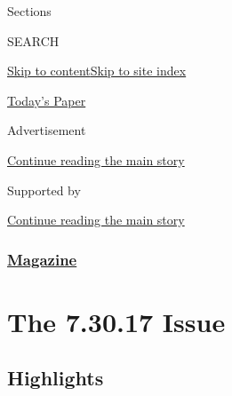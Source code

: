 Sections

SEARCH

\protect\hyperlink{site-content}{Skip to
content}\protect\hyperlink{site-index}{Skip to site index}

\href{https://myaccount.nytimes3xbfgragh.onion/auth/login?response_type=cookie\&client_id=vi}{}

\href{https://www.nytimes3xbfgragh.onion/section/todayspaper}{Today's
Paper}

Advertisement

\protect\hyperlink{after-top}{Continue reading the main story}

Supported by

\protect\hyperlink{after-sponsor}{Continue reading the main story}

\hypertarget{magazine}{%
\subsubsection{\texorpdfstring{\href{/section/magazine}{Magazine}}{Magazine}}\label{magazine}}

\hypertarget{the-73017-issue}{%
\section{The 7.30.17 Issue}\label{the-73017-issue}}

\hypertarget{highlights}{%
\subsection{Highlights}\label{highlights}}

